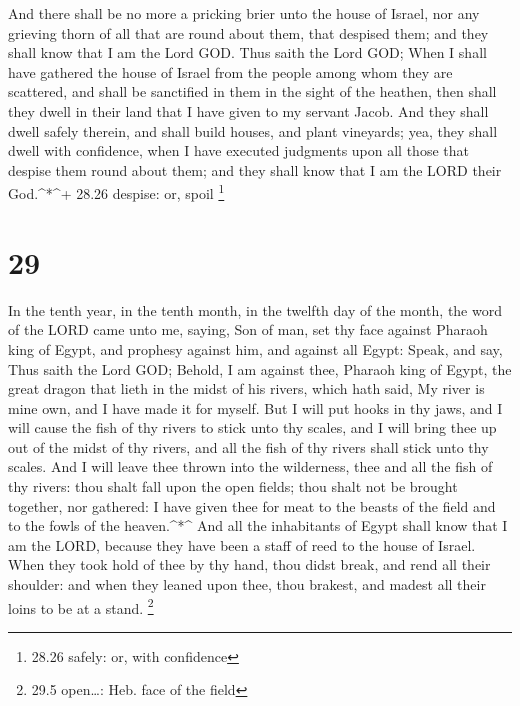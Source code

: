 And there shall be no more a pricking brier unto the house
of Israel, nor any grieving thorn of all that are round about them, that
despised them; and they shall know that I am the Lord GOD. 
Thus saith the Lord GOD; When I shall have gathered the house of Israel
from the people among whom they are scattered, and shall be sanctified
in them in the sight of the heathen, then shall they dwell in their land
that I have given to my servant Jacob.  And they shall
dwell safely therein, and shall build houses, and plant vineyards; yea,
they shall dwell with confidence, when I have executed judgments upon
all those that despise them round about them; and they shall know that I
am the LORD their God.\^{}*\^{}+ 28.26 despise: or, spoil \footnote{28.26
  safely: or, with confidence}

\hypertarget{section-28}{%
\section{29}\label{section-28}}

 In the tenth year, in the tenth month, in the twelfth day
of the month, the word of the LORD came unto me, saying, 
Son of man, set thy face against Pharaoh king of Egypt, and prophesy
against him, and against all Egypt:  Speak, and say, Thus
saith the Lord GOD; Behold, I am against thee, Pharaoh king of Egypt,
the great dragon that lieth in the midst of his rivers, which hath said,
My river is mine own, and I have made it for myself.  But I
will put hooks in thy jaws, and I will cause the fish of thy rivers to
stick unto thy scales, and I will bring thee up out of the midst of thy
rivers, and all the fish of thy rivers shall stick unto thy scales.
 And I will leave thee thrown into the wilderness, thee and
all the fish of thy rivers: thou shalt fall upon the open fields; thou
shalt not be brought together, nor gathered: I have given thee for meat
to the beasts of the field and to the fowls of the heaven.\^{}*\^{}
 And all the inhabitants of Egypt shall know that I am the
LORD, because they have been a staff of reed to the house of Israel.
 When they took hold of thee by thy hand, thou didst break,
and rend all their shoulder: and when they leaned upon thee, thou
brakest, and madest all their loins to be at a stand. \footnote{29.5
  open\ldots: Heb. face of the field}

